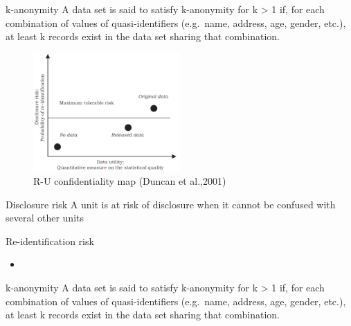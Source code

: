 \documentclass[
  ignorenonframetext,
  aspectratio=169,
]{beamer}
\begin{document}
\begin{frame}{k-anonymity}
\protect\hypertarget{k-anonymity}{}
A data set is said to satisfy k-anonymity for k \textgreater{} 1 if, for
each combination of values of quasi-identifiers (e.g.~name, address,
age, gender, etc.), at least k records exist in the data set sharing
that combination.

\begin{figure}

{\centering \includegraphics[width=0.5\textwidth,height=\textheight]{gallery/R-U confidentiality map.png}

}

\caption{R-U confidentiality map (Duncan et al.,2001)}

\end{figure}
\end{frame}

\begin{frame}{Disclosure risk}
\protect\hypertarget{disclosure-risk}{}
A unit is at risk of disclosure when it cannot be confused with several
other units
\end{frame}

\begin{frame}{Re-identification risk}
\protect\hypertarget{re-identification-risk}{}
\begin{itemize}
\item
  \color{red}{attacker scenarios and risk measures in more detail using examples}
\end{itemize}
\end{frame}

\begin{frame}{k-anonymity}
\protect\hypertarget{k-anonymity-1}{}
A data set is said to satisfy k-anonymity for k \textgreater{} 1 if, for
each combination of values of quasi-identifiers (e.g.~name, address,
age, gender, etc.), at least k records exist in the data set sharing
that combination.
\end{frame}
\end{document}
